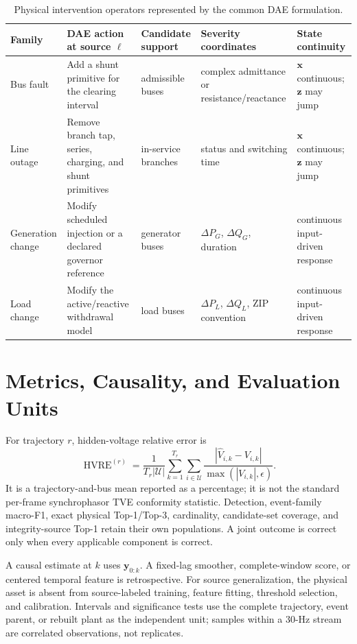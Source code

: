\documentclass{ieeeaccess}
\begin{document}
\begin{table}[t]
\caption{Physical intervention operators represented by the common DAE formulation.}
\label{tab:supp-physical-operators}
\centering
\scriptsize
\begin{tabularx}{\textwidth}{@{}lXlll@{}}
\toprule
Family & DAE action at source $\ell$ & Candidate support & Severity coordinates & State continuity \\
\midrule
Bus fault & Add a shunt primitive for the clearing interval & admissible buses & complex admittance or resistance/reactance & $\bm x$ continuous; $\bm z$ may jump \\
Line outage & Remove branch tap, series, charging, and shunt primitives & in-service branches & status and switching time & $\bm x$ continuous; $\bm z$ may jump \\
Generation change & Modify scheduled injection or a declared governor reference & generator buses & $\Delta P_G$, $\Delta Q_G$, duration & continuous input-driven response \\
Load change & Modify the active/reactive withdrawal model & load buses & $\Delta P_L$, $\Delta Q_L$, ZIP convention & continuous input-driven response \\
\bottomrule
\end{tabularx}
\end{table}

\section{Metrics, Causality, and Evaluation Units}

For trajectory $r$, hidden-voltage relative error is
\begin{equation}
 \operatorname{HVRE}^{(r)}=\frac{1}{T_r|\mathcal U|}
 \sum_{k=1}^{T_r}\sum_{i\in\mathcal U}
 \frac{|\widehat V_{i,k}-V_{i,k}|}{\max(|V_{i,k}|,\epsilon)}.
 \label{eq:supp-hvre}
\end{equation}
It is a trajectory-and-bus mean reported as a percentage; it is not the standard per-frame synchrophasor TVE conformity statistic. Detection, event-family macro-F1, exact physical Top-1/Top-3, cardinality, candidate-set coverage, and integrity-source Top-1 retain their own populations. A joint outcome is correct only when every applicable component is correct.

A causal estimate at $k$ uses $\bm y_{0:k}$. A fixed-lag smoother, complete-window score, or centered temporal feature is retrospective. For source generalization, the physical asset is absent from source-labeled training, feature fitting, threshold selection, and calibration. Intervals and significance tests use the complete trajectory, event parent, or rebuilt plant as the independent unit; samples within a 30-Hz stream are correlated observations, not replicates.
\end{document}
